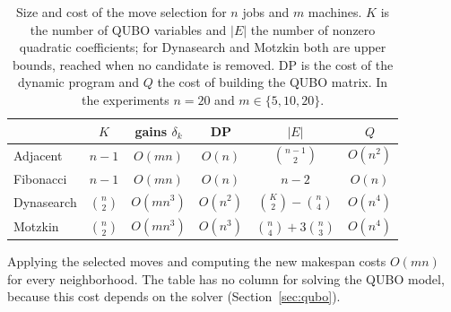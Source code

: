 \documentclass[10pt,twoside,twocolumn,a4paper]{article}
\newif\ifrevmarks \revmarksfalse
\newcommand{\rev}[1]{\ifrevmarks\textcolor{red}{#1}\else#1\fi}
\begin{document}
\begin{table}
\caption{\rev{Size and cost of the move selection for $n$ jobs and $m$ machines. $K$ is the number of QUBO variables and $|E|$ the number of nonzero quadratic coefficients; for Dynasearch and Motzkin both are upper bounds, reached when no candidate is removed. DP is the cost of the dynamic program and $Q$ the cost of building the QUBO matrix. In the experiments $n=20$ and $m\in\{5,10,20\}$.}}\label{tab:sizes}
\centering\footnotesize\ifrevmarks\color{red}\fi
\setlength{\tabcolsep}{3pt}
\begin{tabular}{@{}lccccc@{}}
\toprule
 & $K$ & gains $\delta_k$ & DP & $|E|$ & $Q$\\
\midrule
Adjacent   & $n-1$ & $O(mn)$ & $O(n)$ & $\binom{n-1}{2}$ & $O(n^2)$\\[2pt]
Fibonacci  & $n-1$ & $O(mn)$ & $O(n)$ & $n-2$ & $O(n)$\\[2pt]
Dynasearch & $\binom{n}{2}$ & $O(mn^3)$ & $O(n^2)$ & $\binom{K}{2}-\binom{n}{4}$ & $O(n^4)$\\[2pt]
Motzkin    & $\binom{n}{2}$ & $O(mn^3)$ & $O(n^3)$ & $\binom{n}{4}+3\binom{n}{3}$ & $O(n^4)$\\
\bottomrule
\end{tabular}

\smallskip\footnotesize\raggedright Applying the selected moves and computing the new makespan costs $O(mn)$ for every neighborhood. The table has no column for solving the QUBO model, because this cost depends on the solver (Section~\ref{sec:qubo}).
\end{table}
\end{document}
